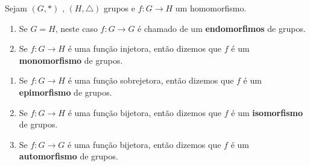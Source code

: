 \documentclass{beamer}
\begin{document}
    \begin{frame}
        \begin{observacao}
            Sejam $(G, *)$ \pause, $(H, \triangle)$ grupos \pause e $f : G \to H$ um homomorfismo. \pause

            \vspace{.5cm}

            \begin{enumerate}[label={\arabic*})]
                \item Se $G = H$, \pause neste caso $f : G \to G$ \pause é chamado de um \textbf{endomorfimos} de grupos.\pause

                \vspace{.5cm}

                \item Se $f : G \to H$ é uma função injetora, \pause então dizemos que $f$ é um \textbf{monomorfismo} de grupos.\pause

                \vspace{.5cm}

                \seti
            \end{enumerate}
        \end{observacao}
    \end{frame}

    \begin{frame}
        \begin{observacao}
            \vspace{.5cm}

            \begin{enumerate}[label={\arabic*})]
                \conti
                \item Se $f : G \to H$ é uma função sobrejetora, \pause então dizemos que $f$ é um \textbf{epimorfismo} de grupos.\pause

                \vspace{.5cm}

                \item Se $f : G \to H$ é uma função bijetora, \pause então dizemos que $f$ é um \textbf{isomorfismo} de grupos.\pause

                \vspace{.5cm}

                \item Se $f : G \to G$ é uma função bijetora, \pause então dizemos que $f$ é um \textbf{automorfismo} de grupos.

                \vspace{.5cm}

            \end{enumerate}
        \end{observacao}
    \end{frame}
\end{document}
